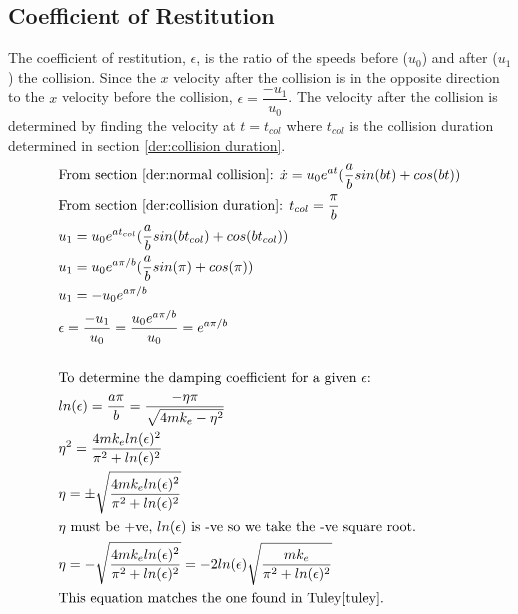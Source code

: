 \documentclass[10pt,a4paper,titlepage]{report}
\begin{document}
\subsection{Coefficient of Restitution}
\label{der:coefficient of restitution}
The coefficient of restitution, $\epsilon$, is the ratio of the speeds before ($u_0$) and after ($u_1$) the collision. Since the $x$ velocity after the collision is in the opposite direction to the $x$ velocity before the collision, $\epsilon = \dfrac{- u_1}{u_0}$. The velocity after the collision is determined by finding the velocity at $t = t_{col}$ where $t_{col}$ is the collision duration determined in section \ref{der:collision duration}.
\begin{align*}
&\text{From section \ref{der:normal collision}: } \dot{x} = u_0 e^{at} (\dfrac{a}{b} sin(bt) + cos(bt)) \\
&\text{From section \ref{der:collision duration}: } t_{col} = \dfrac{\pi}{b} \\
&u_1 = u_0 e^{at_{col}} (\dfrac{a}{b} sin(bt_{col}) + cos(bt_{col})) \\
&u_1 = u_0 e^{a \pi / b} (\dfrac{a}{b} sin(\pi) + cos(\pi)) \\
&u_1 = - u_0 e^{a \pi / b} \\
&\epsilon = \dfrac{- u_1}{u_0} = \dfrac{u_0 e^{a \pi / b}}{u_0} = e^{a \pi / b} \\\\
&\text{To determine the damping coefficient for a given $\epsilon$:} \\
&ln(\epsilon) = \dfrac{a \pi}{b} = \dfrac{- \eta \pi}{\sqrt{4 m k_e - \eta^2}} \\
&\eta^2 = \dfrac{4 m k_e ln(\epsilon)^2}{\pi^2 + ln(\epsilon)^2} \\
&\eta = \pm \sqrt{\dfrac{4 m k_e ln(\epsilon)^2}{\pi^2 + ln(\epsilon)^2}} \\
&\text{$\eta$ must be +ve, $ln(\epsilon)$ is -ve so we take the -ve square root.} \\
&\eta = - \sqrt{\dfrac{4 m k_e ln(\epsilon)^2}{\pi^2 + ln(\epsilon)^2}} 
 = - 2 ln(\epsilon) \sqrt{\dfrac{m k_e}{\pi^2 + ln(\epsilon)^2}} \\
&\text{This equation matches the one found in Tuley\cite{tuley}.}
\end{align*}
\end{document}
